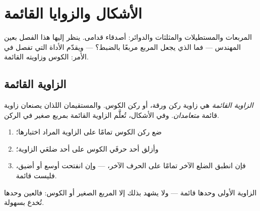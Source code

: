\chapter{الأشكال والزوايا القائمة}\label{ch:g3:shapes}

المربعات والمستطيلات والمثلثات والدوائر: أصدقاء قدامى. ينظر إليها
هذا الفصل بعين المهندس --- فما الذي يجعل المربع مربعًا بالضبط؟ ---
ويقدّم الأداة التي تفصل في الأمر: الكوس
وزاويته القائمة.

\section{الزاوية القائمة}

\begin{definition}\label{def:g3:shapes:rightangle}
\emph{الزاوية القائمة} هي زاوية ركن ورقة، أو
ركن الكوس. والمستقيمان اللذان يصنعان زاوية قائمة
\emph{متعامدان}. وفي الأشكال، تُعلَّم الزاوية القائمة بمربع صغير
في الركن.
\end{definition}

\begin{method}\label{met:g3:shapes:check}
\begin{enumerate}
  \item ضع ركن الكوس تمامًا على الزاوية المراد
        اختبارها؛
  \item وأزلق أحد حرفَي الكوس على أحد ضلعَي الزاوية؛
  \item فإن انطبق الضلع الآخر تمامًا على الحرف الآخر،  --- وإن انفتحت أوسع أو أضيق، فليست
        قائمة.
\end{enumerate}
\end{method}

\begin{omfigure}

{\small الزاوية الأولى وحدها قائمة --- ولا يشهد بذلك إلا المربع
الصغير أو الكوس: فالعين وحدها تُخدع
بسهولة.}
\end{omfigure}

